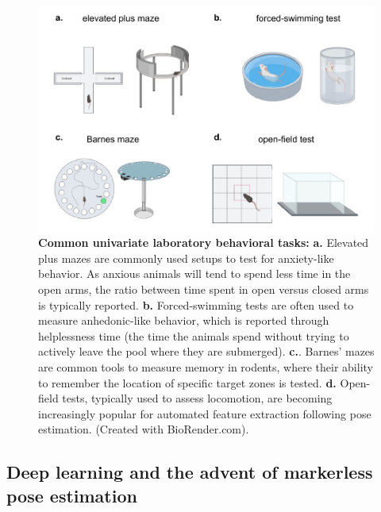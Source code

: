\begin{figure}[!thb]
\centering
\includegraphics[width=\textwidth]{Figures/intro_3.pdf}

\caption[\textbf{Common univariate laboratory behavioral tasks}]{\textbf{Common univariate laboratory behavioral tasks:} \textbf{a.} Elevated plus mazes are commonly used setups to test for anxiety-like behavior. As anxious animals will tend to spend less time in the open arms, the ratio between time spent in open versus closed arms is typically reported. \textbf{b.} Forced-swimming tests are often used to measure anhedonic-like behavior, which is reported through helplessness time (the time the animals spend without trying to actively leave the pool where they are submerged). \textbf{c.}. Barnes' mazes are common tools to measure memory in rodents, where their ability to remember the location of specific target zones is tested. \textbf{d.} Open-field tests, typically used to assess locomotion, are becoming increasingly popular for automated feature extraction following pose estimation. (Created with BioRender.com).}
\label{fig:1.3}

\end{figure}

\subsection{Deep learning and the advent of markerless pose estimation}


